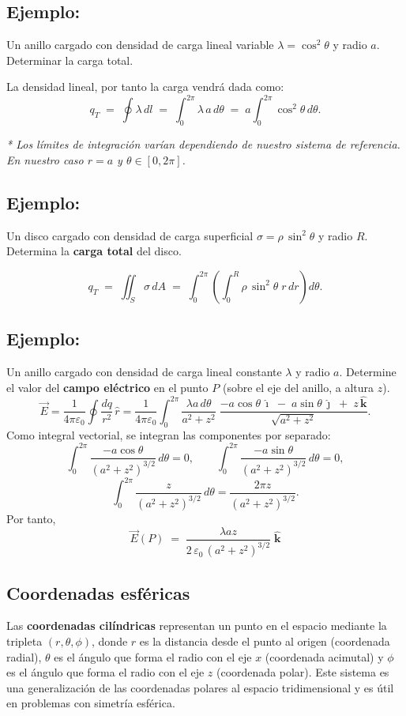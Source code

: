 \documentclass[a4paper,12pt]{article}
\begin{document}
\subsection*{Ejemplo:}
\noindent Un anillo cargado con densidad de carga lineal variable $\lambda=\cos^{2}\theta$ y radio $a$.
Determinar la carga total.

La densidad lineal, por tanto la carga vendrá dada como:
\[
q_T \;=\; \oint \lambda\, dl
 \;=\; \int_{0}^{2\pi} \lambda\, a\, d\theta
 \;=\; a \int_{0}^{2\pi} \cos^{2}\theta\, d\theta .
\]

\textit{* Los límites de integración varían dependiendo de nuestro sistema de referencia.  
En nuestro caso $r=a$ y $\theta\in[0,2\pi]$.}


\subsection*{Ejemplo:}

\noindent
Un disco cargado con densidad de carga superficial $\sigma=\rho\,\sin^{2}\theta$ y radio $R$.  
Determina la \textbf{carga total} del disco.

\[
q_T \;=\; \iint_{S} \sigma\, dA
   \;=\; \int_{0}^{2\pi}\!\left(\int_{0}^{R} \rho\,\sin^{2}\theta \; r\,dr\right)\! d\theta .
\]

\subsection*{Ejemplo:}
\noindent
Un anillo cargado con densidad de carga lineal constante $\lambda$ y radio $a$.  
Determine el valor del \textbf{campo eléctrico} en el punto $P$ (sobre el eje del anillo, a altura $z$).
\[
\vec E
= \frac{1}{4\pi\varepsilon_0}\oint \frac{dq}{r^2}\,\hat r
= \frac{1}{4\pi\varepsilon_0}\int_{0}^{2\pi}
   \frac{\lambda a\, d\theta}{a^{2}+z^{2}}\;
   \frac{-a\cos\theta\,\hat{\imath}\;-\;a\sin\theta\,\hat{\jmath}\;+\;z\,\hat{\mathbf k}}
        {\sqrt{a^{2}+z^{2}}}.
\]
Como integral vectorial, se integran las componentes por separado:
\[
\int_{0}^{2\pi} \frac{-a\cos\theta}{(a^{2}+z^{2})^{3/2}}\, d\theta = 0, \qquad
\int_{0}^{2\pi} \frac{-a\sin\theta}{(a^{2}+z^{2})^{3/2}}\, d\theta = 0,
\]
\[
\int_{0}^{2\pi} \frac{z}{(a^{2}+z^{2})^{3/2}}\, d\theta
= \frac{2\pi z}{(a^{2}+z^{2})^{3/2}}.
\]
Por tanto,
\[
\boxed{\;
\vec E(P) \;=\; \frac{\lambda a z}{2\,\varepsilon_0\,(a^{2}+z^{2})^{3/2}}\;\hat{\mathbf k}
\;}
\]
\newpage
\subsection{Coordenadas esféricas}
\noindent Las \textbf{coordenadas cilíndricas} representan un punto en el espacio mediante la tripleta
 $(r,\theta,\phi)$, donde $r$ es la distancia desde el punto al origen (coordenada radial),
  $\theta$ es el ángulo que forma el radio con el eje $x$ (coordenada acimutal) y $\phi$ es el
   ángulo que forma el radio con el eje $z$ (coordenada polar). Este sistema es una generalización
    de las coordenadas polares al espacio tridimensional y es útil en problemas con simetría esférica.\\
\end{document}
